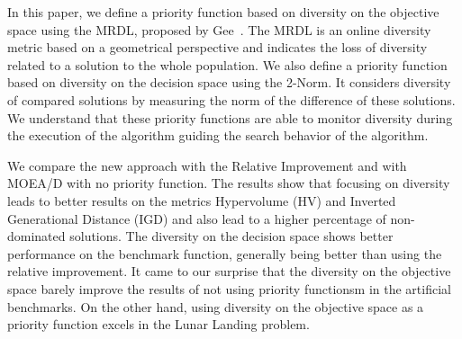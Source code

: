 In this paper, we define a priority function based on diversity on the objective space using the MRDL, proposed by Gee~\cite{gee2015online}. The MRDL is an online diversity metric based on a geometrical perspective and indicates the loss of diversity related to a solution to the whole population. We also define a priority function based on diversity on the decision space using the 2-Norm. It considers diversity of compared solutions by measuring the norm of  the difference of these solutions. We understand that these priority functions are able to monitor diversity during the execution of the algorithm guiding the search behavior of the algorithm.


We compare the new approach with the Relative Improvement and with  MOEA/D with no priority function. The results show that focusing on diversity leads to better results on the metrics Hypervolume (HV) and Inverted Generational Distance (IGD) and also lead to a higher percentage of non-dominated solutions. The diversity on the decision space shows better performance on the benchmark function,  generally being better than using the relative improvement. It came to our surprise that the diversity on the objective space barely improve the results of not using priority functionsm in the artificial benchmarks. On the other hand, using diversity on the objective space as a priority function excels in the Lunar Landing problem.



